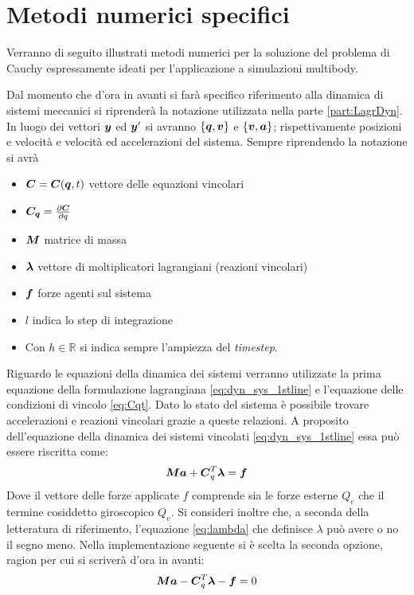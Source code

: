 \chapter{Metodi numerici specifici}
Verranno di seguito illustrati metodi numerici per la soluzione del problema di Cauchy espressamente ideati per l'applicazione a simulazioni multibody.

Dal momento che d'ora in avanti si farà specifico riferimento alla dinamica di sistemi meccanici si riprenderà la notazione utilizzata nella parte \ref{part:LagrDyn}. In luogo dei vettori ${\boldsymbol{y}}$ ed ${\boldsymbol{y}}'$ si avranno $\{{\boldsymbol{q}} , {\boldsymbol{v}}\}$ e $\{{\boldsymbol{v}} , {\boldsymbol{a}}\}$; rispettivamente posizioni e velocità e velocità ed accelerazioni del sistema. Sempre riprendendo la notazione si avrà \begin{itemize}
    \item ${\boldsymbol{C}} = {\boldsymbol{C}}({\boldsymbol{q}},t)$ vettore delle equazioni vincolari
    \item ${\boldsymbol{C_q}} =\frac{\partial{\boldsymbol{C}}}{\partial q}$
    \item ${\boldsymbol{M}}$ matrice di massa
    \item ${\boldsymbol{\lambda}}$ vettore di moltiplicatori lagrangiani (reazioni vincolari)
    \item ${\boldsymbol{f}}$ forze agenti sul sistema
    \item $l$ indica lo step di integrazione
    \item Con $h \in \mathbb{R}$ si indica sempre l'ampiezza del \emph{timestep}. 

\end{itemize}

Riguardo le equazioni della dinamica dei sistemi verranno utilizzate la prima equazione della formulazione lagrangiana \ref{eq:dyn_sys_1stline} e l'equazione delle condizioni di vincolo \ref{eq:Cqt}. Dato lo stato del sistema è possibile trovare accelerazioni e reazioni vincolari grazie a queste relazioni.
A proposito dell'equazione della dinamica dei sistemi vincolati \ref{eq:dyn_sys_1stline} essa può essere riscritta come: \[{\boldsymbol{M}}{\boldsymbol{a}} + {\boldsymbol{C}}_q^T{\boldsymbol{\lambda}} = {\boldsymbol{f}} \] Dove il vettore delle forze applicate $f$ comprende sia le forze esterne $Q_e$ che il termine cosiddetto giroscopico $Q_v$. Si consideri inoltre che, a seconda della letteratura di riferimento, l'equazione \ref{eq:lambda} che definisce $\lambda$ può avere o no il segno meno. Nella implementazione seguente si è scelta la seconda opzione, ragion per cui si scriverà d'ora in avanti:
\begin{equation}\label{eq:dynamics}
    {\boldsymbol{M}}{\boldsymbol{a}}-{\boldsymbol{C}}_q^T{\boldsymbol{\lambda}}-{\boldsymbol{f}} = 0
\end{equation}

